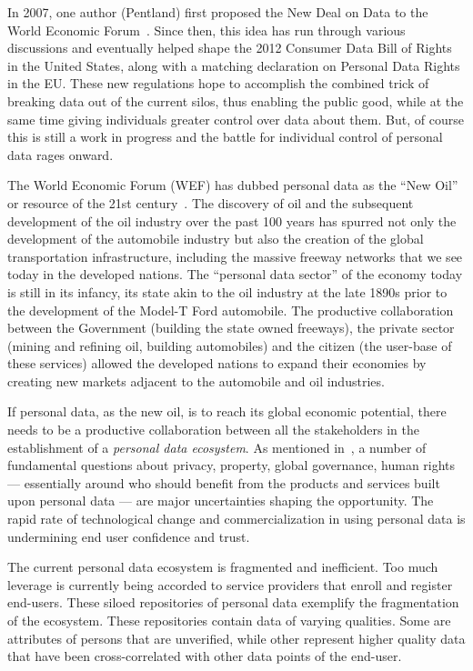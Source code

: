In 2007, one author (Pentland) first proposed the New Deal on Data to the World Economic Forum~\cite{WEF2011}. 
Since then, this idea has run through various discussions and eventually helped shape the 2012 Consumer Data Bill of Rights in the United States, along with a matching declaration on Personal Data Rights in the EU.
These new regulations hope to accomplish the combined trick of breaking data out of the current silos, thus enabling the public good, while at the same time giving individuals greater control over data about them.
But, of course this is still a work in progress and the battle for individual control of personal data rages onward.


The World Economic Forum (WEF) has dubbed personal data as the ``New Oil'' or resource of the 21st century~\cite{WEF2011}.
The discovery of oil and the subsequent development of the oil industry over the past 100 years has spurred not only the development of the automobile industry but also the creation of the global transportation infrastructure, including the massive freeway networks that we see today in the developed nations.
The ``personal data sector'' of the economy today is still in its infancy, its state akin to the oil industry at the late 1890s prior to the development of the Model-T Ford automobile.
The productive collaboration between the Government (building the state owned freeways), the private sector (mining and refining oil, building automobiles) and the citizen (the user-base of these services) allowed the developed nations to expand their economies by creating new markets adjacent to the automobile and oil industries.

If personal data, as the new oil, is to reach  its global economic potential, there needs to be a productive collaboration between all the stakeholders in the establishment of a {\em personal data ecosystem}.
As mentioned in~\cite{WEF2011}, a number of fundamental questions about privacy, property, 
global governance, human rights --- essentially around who should benefit from the products and services built upon personal data --- are major uncertainties shaping the opportunity.
The rapid rate of technological change and commercialization in using personal data is undermining end user confidence and trust.

The current personal data ecosystem is fragmented and inefficient.
Too much leverage is currently being accorded to service providers that enroll
and register end-users.
These siloed repositories of personal data exemplify the fragmentation of the ecosystem.
These repositories contain data of varying qualities.
Some are attributes of persons that are unverified, while other represent higher quality data that have been cross-correlated with other data points of the end-user.

